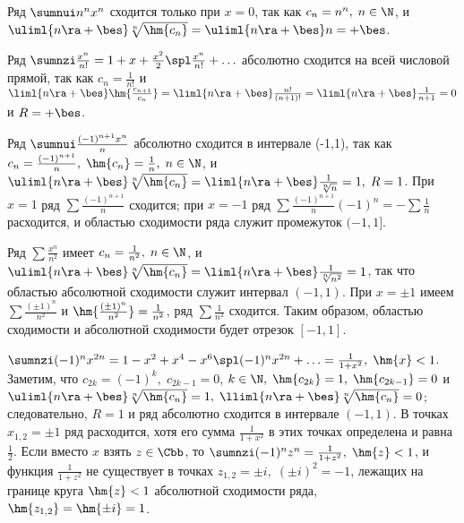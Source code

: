 \documentclass[a4paper]{article}
\begin{document}
\begin{ex}
Ряд $\sumnui n^n x^n$ сходится только при $x=0$, так как $c_n=n^n,
\; n\in\N$, и $\uliml{n\ra+\bes} \sqrt[n]{\hm{c_n}} =
\uliml{n\ra+\bes} n = +\bes$.
\end{ex}

\begin{ex}
Ряд $\sumnzi \frac{x^n}{n!} = 1+x+\frac{x^2}2 \spl \frac{x^n}{n!} +
\ldots$ абсолютно сходится на всей числовой прямой, так как
$c_n=\frac1{n!}$ и $\liml{n\ra+\bes} \hm{\frac{c_{n+1}}{c_n}} =
\liml{n\ra+\bes} \frac{n!}{(n+1)!} = \liml{n\ra+\bes} \frac1{n+1}=0$
и $R=+\bes$.
\end{ex}

\begin{ex}
Ряд $\sumnui \frac{(-1)^{n+1} x^n}{n}$ абсолютно сходится в
интервале (-1,1), так как $c_n = \frac{(-1)^{n+1}}n, \;
\hm{c_n}=\frac1n, \; n\in\N$, и $\uliml{n\ra+\bes}
\sqrt[n]{\hm{c_n}} = \liml{n\ra+\bes} \frac1{\sqrt[n]{n}}=1, \;
R=1$. При $x=1$ ряд $\sum \frac{(-1)^{n+1}}{n}$ сходится; при $x=-1$
ряд $\sum \frac{(-1)^{n+1}}{n} (-1)^n = -\sum\frac1n$ расходится, и
областью сходимости ряда служит промежуток $(-1,1]$.
\end{ex}

\begin{ex}
Ряд $\sum \frac{x^n}{n^2}$ имеет $c_n=\frac1{n^2}, \; n\in\N$, и
$\uliml{n\ra+\bes} \sqrt[n]{\hm{c_n}}=\liml{n\ra+\bes}
\frac1{\sqrt[n]{n^2}}=1$, так что областью абсолютной сходимости
служит интервал $(-1,1)$. При $x=\pm1$ имеем $\sum
\frac{(\pm1)^n}{n^2}$ и $\hm{\frac{(\pm1)^n}{n^2}}=\frac1{n^2}$, ряд
$\sum\frac1{n^2}$ сходится. Таким образом, областью сходимости и
абсолютной сходимости будет отрезок $[-1,1]$.
\end{ex}

\begin{ex}
$\sumnzi (-1)^n x^{2n} = 1 - x^2 + x^4 - x^6 \spl (-1)^n x^{2n} +
\ldots = \frac1{1+x^2}, \; \hm{x}<1$. Заметим, что $c_{2k} = (-1)^k,
\; c_{2k-1}=0$, $k\in\N, \; \hm{c_{2k}}=1, \; \hm{c_{2k-1}}=0$ и
$\uliml{n\ra+\bes} \sqrt[n]{\hm{c_n}}=1, \; \lliml{n\ra+\bes}
\sqrt[n]{\hm{c_n}}=0$; следовательно, $R=1$ и ряд абсолютно сходится
в интервале $(-1,1)$. В точках $x_{1,2}=\pm1$ ряд расходится, хотя
его сумма $\frac1{1+x^2}$ в этих точках определена и равна
$\frac12$. Если вместо $x$ взять $z\in\Cbb$, то $\sumnzi (-1)^n z^n
= \frac1{1+z^2}, \; \hm{z}<1$, и функция $\frac1{1+z^2}$ не
существует в точках $z_{1,2}=\pm i, \; (\pm i)^2=-1$, лежащих на
границе круга $\hm{z}<1$ абсолютной сходимости ряда, $\hm{z_{1,2}} =
\hm{\pm i}=1$.
\end{ex}
\end{document}
